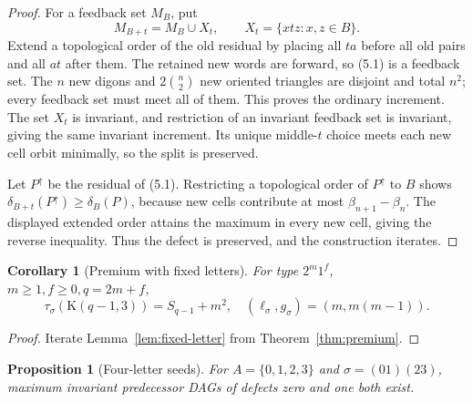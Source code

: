 \documentclass[11pt,a4paper]{article}
\newtheorem{proposition}[theorem]{Proposition}
\newtheorem{corollary}[theorem]{Corollary}
\theoremstyle{remark}
\newcommand{\Kautz}{\mathrm K}
\begin{document}
\begin{proof}
For a feedback set \(M_B\), put
\[
 M_{B+t}=M_B\cup X_t,\qquad X_t=\{xtz:x,z\in B\}.       \tag{5.1}
\]
Extend a topological order of the old residual by placing all \(ta\) before
all old pairs and all \(at\) after them.  The retained new words are forward,
so (5.1) is a feedback set.  The \(n\) new digons and
\(2\binom n2\) new oriented triangles are disjoint and total \(n^2\); every
feedback set must meet all of them.  This proves the ordinary increment.
The set \(X_t\) is invariant, and restriction of an invariant feedback set is
invariant, giving the same invariant increment.  Its unique middle-\(t\)
choice meets each new cell orbit minimally, so the split is preserved.

Let \(P^\uparrow\) be the residual of (5.1).  Restricting a topological order
of \(P^\uparrow\) to \(B\) shows
\(\delta_{B+t}(P^\uparrow)\geq\delta_B(P)\), because new cells contribute
at most \(\beta_{n+1}-\beta_n\).  The displayed extended order attains the
maximum in every new cell, giving the reverse inequality.  Thus the defect
is preserved, and the construction iterates.
\end{proof}

\begin{corollary}[Premium with fixed letters]
\label{cor:premium-general}
For type \(2^m1^f\), \(m\geq1,f\geq0,q=2m+f\),
\[
 \tau_\sigma(\Kautz(q-1,3))=S_{q-1}+m^2,
 \quad(\ell_\sigma,g_\sigma)=(m,m(m-1)).
\]
\end{corollary}

\begin{proof}
Iterate Lemma~\ref{lem:fixed-letter} from Theorem~\ref{thm:premium}.
\end{proof}

\begin{proposition}[Four-letter seeds]
\label{prop:four-letter}
For \(A=\{0,1,2,3\}\) and \(\sigma=(01)(23)\), maximum invariant
predecessor DAGs of defects zero and one both exist.
\end{proposition}
\end{document}
